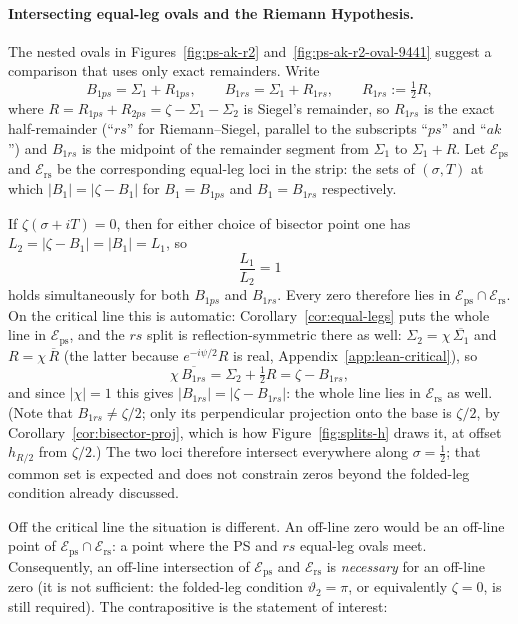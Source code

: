 \documentclass[11pt]{article}
\theoremstyle{definition}
\begin{document}
\paragraph{Intersecting equal-leg ovals and the Riemann Hypothesis.}
The nested ovals in Figures~\ref{fig:ps-ak-r2}
and~\ref{fig:ps-ak-r2-oval-9441} suggest a comparison that uses only exact
remainders. Write
\[
B_{1ps}
=
\Sigma_1+R_{1ps},
\qquad
B_{1rs}
=
\Sigma_1+R_{1rs},
\qquad
R_{1rs}
:=
\tfrac12 R,
\]
where $R=R_{1ps}+R_{2ps}=\zeta-\Sigma_1-\Sigma_2$ is Siegel's remainder, so
$R_{1rs}$ is the exact half-remainder (``$rs$'' for Riemann--Siegel, parallel to
the subscripts ``$ps$'' and ``$ak$'') and $B_{1rs}$ is the midpoint of
the remainder segment from $\Sigma_1$ to $\Sigma_1+R$. Let
$\mathcal{E}_{\mathrm{ps}}$ and $\mathcal{E}_{\mathrm{rs}}$ be the corresponding
equal-leg loci in the strip:
the sets of $(\sigma,T)$ at which $|B_1|=|\zeta-B_1|$ for
$B_1=B_{1ps}$ and $B_1=B_{1rs}$ respectively.

If $\zeta(\sigma+iT)=0$, then for either choice of bisector point one has
$L_2=|\zeta-B_1|=|B_1|=L_1$, so
\[
\frac{L_1}{L_2}=1
\]
holds simultaneously for both $B_{1ps}$ and $B_{1rs}$. Every
zero therefore lies in
$\mathcal{E}_{\mathrm{ps}}\cap\mathcal{E}_{\mathrm{rs}}$. On the critical line
this is automatic: Corollary~\ref{cor:equal-legs} puts the whole line in
$\mathcal{E}_{\mathrm{ps}}$, and the $rs$ split is reflection-symmetric there
as well: $\Sigma_2=\chi\,\overline{\Sigma_1}$ and $R=\chi\,\overline{R}$ (the
latter because $e^{-i\psi/2}R$ is real, Appendix~\ref{app:lean-critical}), so
\[
\chi\,\overline{B_{1rs}}
=\Sigma_2+\tfrac12 R
=\zeta-B_{1rs},
\]
and since $|\chi|=1$ this gives
$\bigl|B_{1rs}\bigr|=\bigl|\zeta-B_{1rs}\bigr|$: the whole
line lies in $\mathcal{E}_{\mathrm{rs}}$ as well. (Note that
$B_{1rs}\neq\zeta/2$; only its perpendicular projection onto the
base is $\zeta/2$, by Corollary~\ref{cor:bisector-proj}, which is how
Figure~\ref{fig:splits-h} draws it, at offset $h_{R/2}$ from $\zeta/2$.) The
two loci therefore intersect everywhere
along $\sigma=\tfrac12$; that common set is expected and does not constrain zeros
beyond the folded-leg condition already discussed.

Off the critical line the situation is different. An off-line zero would be an
off-line point of $\mathcal{E}_{\mathrm{ps}}\cap\mathcal{E}_{\mathrm{rs}}$: a
point where the PS and $rs$ equal-leg ovals meet. Consequently, an off-line
intersection of $\mathcal{E}_{\mathrm{ps}}$ and $\mathcal{E}_{\mathrm{rs}}$ is
\emph{necessary} for an off-line zero (it is not sufficient: the folded-leg
condition $\vartheta_2=\pi$, or equivalently $\zeta=0$, is still required). The
contrapositive is the statement of interest:
\end{document}
